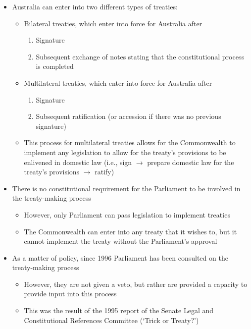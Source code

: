 \begin{itemize}
    \item Australia can enter into two different types of treaties:
    \begin{itemize}
        \item Bilateral treaties, which enter into force for Australia after
        \begin{enumerate}
            \item Signature
            \item Subsequent exchange of notes stating that the constitutional process is completed
        \end{enumerate}
        \item Multilateral treaties, which enter into force for Australia after
        \begin{enumerate}
            \item Signature
            \item Subsequent ratification (or accession if there was no previous signature)
        \end{enumerate}
        \item This process for multilateral treaties allows for the Commonwealth to implement any legislation to allow for the treaty's provisions to be enlivened in domestic law (i.e., sign $\rightarrow$ prepare domestic law for the treaty's provisions $\rightarrow$ ratify)
    \end{itemize}
    \item There is no constitutional requirement for the Parliament to be involved in the treaty-making process
    \begin{itemize}
        \item However, only Parliament can pass legislation to implement treaties
        \item The Commonwealth can enter into any treaty that it wishes to, but it cannot implement the treaty without the Parliament's approval
    \end{itemize}
    \item As a matter of policy, since 1996 Parliament has been consulted on the treaty-making process
    \begin{itemize}
        \item However, they are not given a veto, but rather are provided a capacity to provide input into this process
        \item This was the result of the 1995 report of the Senate Legal and Constitutional References Committee (`Trick or Treaty?')

\end{itemize}
\end{itemize}
